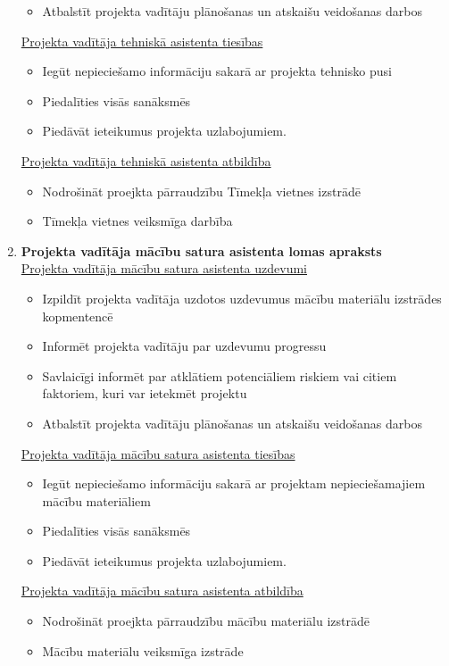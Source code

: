 \begin{enumerate}
\begin{itemize}
      \item Atbalstīt projekta vadītāju plānošanas un atskaišu veidošanas darbos
    \end{itemize}
    \underline{Projekta vadītāja tehniskā asistenta tiesības}
    \begin{itemize}
      \item Iegūt nepieciešamo informāciju sakarā ar projekta tehnisko pusi
      \item Piedalīties visās sanāksmēs
      \item Piedāvāt ieteikumus projekta uzlabojumiem.
    \end{itemize}
    \underline{Projekta vadītāja tehniskā asistenta atbildība}
    \begin{itemize}
      \item Nodrošināt proejkta pārraudzību Tīmekļa vietnes izstrādē
      \item Tīmekļa vietnes veiksmīga darbība
    \end{itemize}
  \item \textbf{Projekta vadītāja mācību satura asistenta lomas apraksts} \\
    \underline{Projekta vadītāja mācību satura asistenta uzdevumi}
    \begin{itemize}
      \item Izpildīt projekta vadītāja uzdotos uzdevumus mācību materiālu izstrādes kopmentencē
      \item Informēt projekta vadītāju par uzdevumu progressu
      \item Savlaicīgi informēt par atklātiem potenciāliem riskiem vai citiem faktoriem, kuri var ietekmēt projektu
      \item Atbalstīt projekta vadītāju plānošanas un atskaišu veidošanas darbos
    \end{itemize}
    \underline{Projekta vadītāja mācību satura asistenta tiesības}
    \begin{itemize}
      \item Iegūt nepieciešamo informāciju sakarā ar projektam nepieciešamajiem mācību materiāliem
      \item Piedalīties visās sanāksmēs
      \item Piedāvāt ieteikumus projekta uzlabojumiem.
    \end{itemize}
    \underline{Projekta vadītāja mācību satura asistenta atbildība}
    \begin{itemize}
      \item Nodrošināt proejkta pārraudzību mācību materiālu izstrādē
      \item Mācību materiālu veiksmīga izstrāde
    \end{itemize}
    \label{app:Projekta_instituciju_apraksts}
\end{enumerate}
\clearpage